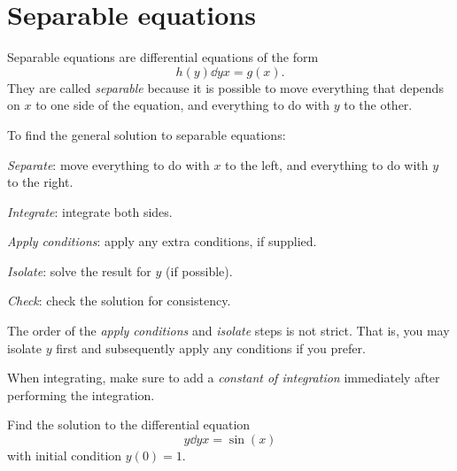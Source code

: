 \documentclass{book}
\begin{document}
\newpage
\section{Separable equations}

Separable equations are differential equations of the form
\begin{dmath}
  \label{eq:separable}
  h(y) \dd{y}{x} = g(x).
\end{dmath}
They are called \emph{separable} because it is possible to move
everything that depends on $x$ to one side of the equation, and
everything to do with $y$ to the other.

To find the general solution to separable equations:
\begin{enumerate*}
\item \emph{Separate}: move everything to do with $x$ to the left, and
  everything to do with $y$ to the right.
\item \emph{Integrate}: integrate both sides.
\item \emph{Apply conditions}: apply any extra conditions, if
  supplied.
\item \emph{Isolate}: solve the result for $y$ (if possible).
\item \emph{Check}: check the solution for consistency.
\end{enumerate*}

The order of the \emph{apply conditions} and \emph{isolate} steps is
not strict.  That is, you may isolate $y$ first and subsequently apply
any conditions if you prefer.

\begin{heads}
  When integrating, make sure to add a \emph{constant of integration}
  immediately after performing the integration.
\end{heads}

\newpage
\begin{easyexample}
  Find the solution to the differential equation
  \begin{dmath}
    \label{eq:ex:separable}
    y \dd{y}{x} = \sin(x)
  \end{dmath}
  with initial condition $y(0) = 1$.
\end{easyexample}
\end{document}
